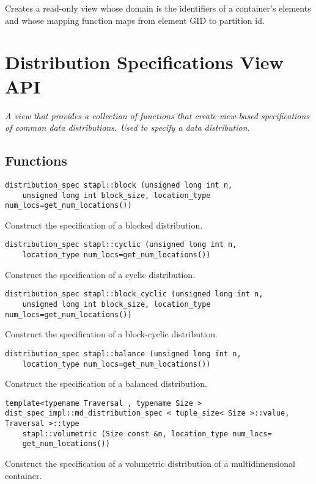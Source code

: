 Creates a read-only view whose domain is the identifiers of a container's elements and whose mapping function maps from element GID to partition id.

\section{Distribution Specifications View API} \label{sec-dist-spec-vw}

\emph{A view that provides a collection of functions that create view-based specifications of common data distributions.  Used to specify a data distribution.}

\subsection{Functions}

\begin{verbatim}
distribution_spec stapl::block (unsigned long int n,
    unsigned long int block_size, location_type num_locs=get_num_locations())
\end{verbatim}

Construct the specification of a blocked distribution.

\begin{verbatim}
distribution_spec stapl::cyclic (unsigned long int n,
    location_type num_locs=get_num_locations())
\end{verbatim}

Construct the specification of a cyclic distribution.

\begin{verbatim}
distribution_spec stapl::block_cyclic (unsigned long int n,
    unsigned long int block_size, location_type num_locs=get_num_locations())
\end{verbatim}

Construct the specification of a block-cyclic distribution.

\begin{verbatim}
distribution_spec stapl::balance (unsigned long int n,
    location_type num_locs=get_num_locations())
\end{verbatim}

Construct the specification of a balanced distribution.

\begin{verbatim}
template<typename Traversal , typename Size >
dist_spec_impl::md_distribution_spec < tuple_size< Size >::value, Traversal >::type
    stapl::volumetric (Size const &n, location_type num_locs=
    get_num_locations())
\end{verbatim}

Construct the specification of a volumetric distribution of a multidimensional container.
